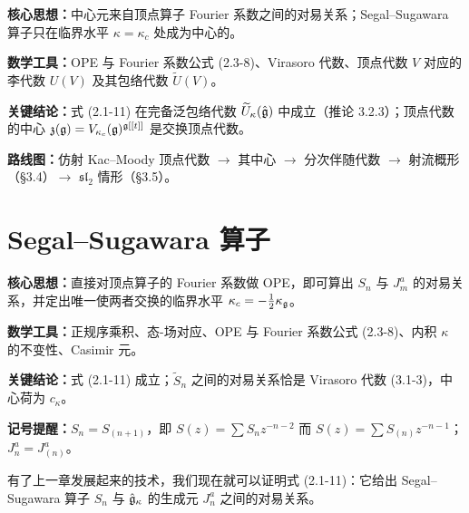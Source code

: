 
\begin{keypoints}
    \item \textbf{核心思想：}中心元来自顶点算子 Fourier 系数之间的对易关系；Segal--Sugawara 算子只在临界水平 $\kappa=\kappa_c$ 处成为中心的。
    \item \textbf{数学工具：}OPE 与 Fourier 系数公式 (2.3-8)、Virasoro 代数、顶点代数 $V$ 对应的李代数 $U(V)$ 及其包络代数 $\widetilde U(V)$。
    \item \textbf{关键结论：}式 (2.1-11) 在完备泛包络代数 $\widetilde U_\kappa(\hat{\mathfrak{g}})$ 中成立（推论 3.2.3）；顶点代数的中心 $\mathfrak z(\mathfrak{g})=V_{\kappa_c}(\mathfrak{g})^{\mathfrak{g}[[t]]}$ 是交换顶点代数。
    \item \textbf{路线图：}仿射 Kac--Moody 顶点代数 $\to$ 其中心 $\to$ 分次伴随代数 $\to$ 射流概形（§3.4）$\to$ $\mathfrak{sl}_2$ 情形（§3.5）。
\end{keypoints}

\section{Segal--Sugawara 算子}

\begin{keypoints}
    \item \textbf{核心思想：}直接对顶点算子的 Fourier 系数做 OPE，即可算出 $S_n$ 与 $J^a_m$ 的对易关系，并定出唯一使两者交换的临界水平 $\kappa_c=-\tfrac12\kappa_{\mathfrak{g}}$。
    \item \textbf{数学工具：}正规序乘积、态-场对应、OPE 与 Fourier 系数公式 (2.3-8)、内积 $\kappa$ 的不变性、Casimir 元。
    \item \textbf{关键结论：}式 (2.1-11) 成立；$\widetilde S_n$ 之间的对易关系恰是 Virasoro 代数 (3.1-3)，中心荷为 $c_\kappa$。
    \item \textbf{记号提醒：}$S_n=S_{(n+1)}$，即 $S(z)=\sum S_n z^{-n-2}$ 而 $S(z)=\sum S_{(n)}z^{-n-1}$；$J^a_n=J^a_{(n)}$。
\end{keypoints}

有了上一章发展起来的技术，我们现在就可以证明式 (2.1-11)：它给出 Segal--Sugawara 算子 $S_n$ 与 $\hat{\mathfrak{g}}_\kappa$ 的生成元 $J^a_n$ 之间的对易关系。

